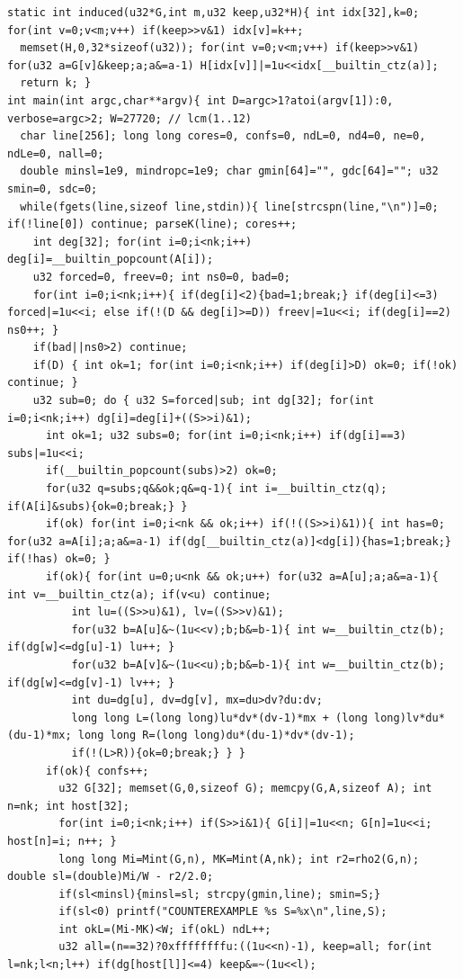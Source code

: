 \documentclass[11pt]{amsart}
\theoremstyle{definition}
\begin{document}
\begin{lstlisting}
static int induced(u32*G,int m,u32 keep,u32*H){ int idx[32],k=0; for(int v=0;v<m;v++) if(keep>>v&1) idx[v]=k++;
  memset(H,0,32*sizeof(u32)); for(int v=0;v<m;v++) if(keep>>v&1) for(u32 a=G[v]&keep;a;a&=a-1) H[idx[v]]|=1u<<idx[__builtin_ctz(a)];
  return k; }
int main(int argc,char**argv){ int D=argc>1?atoi(argv[1]):0, verbose=argc>2; W=27720; // lcm(1..12)
  char line[256]; long long cores=0, confs=0, ndL=0, nd4=0, ne=0, ndLe=0, nall=0;
  double minsl=1e9, mindropc=1e9; char gmin[64]="", gdc[64]=""; u32 smin=0, sdc=0;
  while(fgets(line,sizeof line,stdin)){ line[strcspn(line,"\n")]=0; if(!line[0]) continue; parseK(line); cores++;
    int deg[32]; for(int i=0;i<nk;i++) deg[i]=__builtin_popcount(A[i]);
    u32 forced=0, freev=0; int ns0=0, bad=0;
    for(int i=0;i<nk;i++){ if(deg[i]<2){bad=1;break;} if(deg[i]<=3) forced|=1u<<i; else if(!(D && deg[i]>=D)) freev|=1u<<i; if(deg[i]==2) ns0++; }
    if(bad||ns0>2) continue;
    if(D) { int ok=1; for(int i=0;i<nk;i++) if(deg[i]>D) ok=0; if(!ok) continue; }
    u32 sub=0; do { u32 S=forced|sub; int dg[32]; for(int i=0;i<nk;i++) dg[i]=deg[i]+((S>>i)&1);
      int ok=1; u32 subs=0; for(int i=0;i<nk;i++) if(dg[i]==3) subs|=1u<<i;
      if(__builtin_popcount(subs)>2) ok=0;
      for(u32 q=subs;q&&ok;q&=q-1){ int i=__builtin_ctz(q); if(A[i]&subs){ok=0;break;} }
      if(ok) for(int i=0;i<nk && ok;i++) if(!((S>>i)&1)){ int has=0; for(u32 a=A[i];a;a&=a-1) if(dg[__builtin_ctz(a)]<dg[i]){has=1;break;} if(!has) ok=0; }
      if(ok){ for(int u=0;u<nk && ok;u++) for(u32 a=A[u];a;a&=a-1){ int v=__builtin_ctz(a); if(v<u) continue;
          int lu=((S>>u)&1), lv=((S>>v)&1);
          for(u32 b=A[u]&~(1u<<v);b;b&=b-1){ int w=__builtin_ctz(b); if(dg[w]<=dg[u]-1) lu++; }
          for(u32 b=A[v]&~(1u<<u);b;b&=b-1){ int w=__builtin_ctz(b); if(dg[w]<=dg[v]-1) lv++; }
          int du=dg[u], dv=dg[v], mx=du>dv?du:dv;
          long long L=(long long)lu*dv*(dv-1)*mx + (long long)lv*du*(du-1)*mx; long long R=(long long)du*(du-1)*dv*(dv-1);
          if(!(L>R)){ok=0;break;} } }
      if(ok){ confs++;
        u32 G[32]; memset(G,0,sizeof G); memcpy(G,A,sizeof A); int n=nk; int host[32];
        for(int i=0;i<nk;i++) if(S>>i&1){ G[i]|=1u<<n; G[n]=1u<<i; host[n]=i; n++; }
        long long Mi=Mint(G,n), MK=Mint(A,nk); int r2=rho2(G,n); double sl=(double)Mi/W - r2/2.0;
        if(sl<minsl){minsl=sl; strcpy(gmin,line); smin=S;}
        if(sl<0) printf("COUNTEREXAMPLE %s S=%x\n",line,S);
        int okL=(Mi-MK)<W; if(okL) ndL++;
        u32 all=(n==32)?0xffffffffu:((1u<<n)-1), keep=all; for(int l=nk;l<n;l++) if(dg[host[l]]<=4) keep&=~(1u<<l);

\end{lstlisting}
\end{document}
